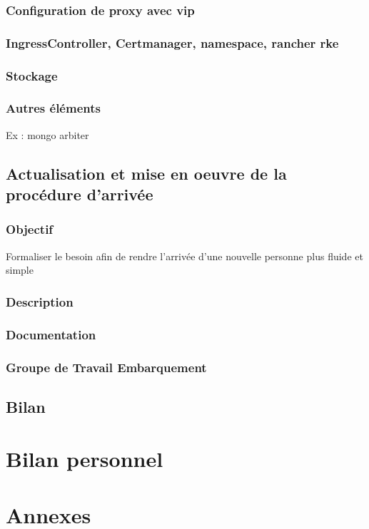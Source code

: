 \documentclass[12pt]{article}
\begin{document}
\subsubsection{Configuration de proxy avec vip}
\subsubsection{IngressController, Certmanager, namespace, rancher rke}
\subsubsection{Stockage}
\subsubsection{Autres éléments}
Ex : mongo arbiter

\newpage
\subsection{Actualisation et mise en oeuvre de la procédure d'arrivée}
\subsubsection{Objectif}
Formaliser le besoin afin de rendre l'arrivée d'une nouvelle personne plus fluide et simple
\subsubsection{Description}
\subsubsection{Documentation}
\subsubsection{Groupe de Travail Embarquement}


\newpage
\subsection{Bilan}

\newpage
\section{Bilan personnel}


\newpage
\section{Annexes}
\end{document}
